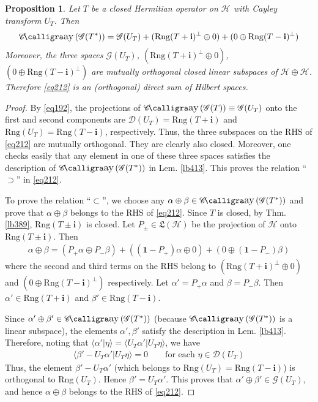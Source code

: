 \documentclass[12pt,b5paper,notitlepage]{article}
\theoremstyle{definition}
\theoremstyle{plain}
\newtheorem{pp}[df]{Proposition}
\DeclareMathOperator{\Cay}{\mathscr{C}\text{\kern -3pt {\calligra\large ay}}\,}
\newcommand{\fk}{\mathfrak}
\newcommand{\idt}{\mathbf{1}}
\newcommand{\Dom}{\mathscr{D}}
\newcommand{\bk}[1]{\langle {#1}\rangle}
\newcommand{\im}{\mathbf{i}}
\newcommand{\Rng}{\mathrm{Rng}}
\newcommand{\MH}{\mathcal H}
\newcommand{\SG}{\mathscr G}
\numberwithin{equation}{section}
\begin{document}
\begin{pp}
Let $T$ be a closed Hermitian operator on $\MH$ with Cayley transform $U_T$. Then
\begin{align}\label{eq212}
\Cay(\SG(T^*))=\SG(U_T)+(\Rng(T+\im)^\perp\oplus 0)+(0\oplus\Rng(T-\im)^\perp)
\end{align}
Moreover, the three spaces $\SG(U_T)$, $(\Rng(T+\im)^\perp\oplus 0)$, $(0\oplus\Rng(T-\im)^\perp)$ are mutually orthogonal closed linear subspaces of $\MH\oplus\MH$. Therefore \eqref{eq212} is an (orthogonal) direct sum of Hilbert spaces.
\end{pp}

\begin{proof}
By \eqref{eq192}, the projections of $\Cay(\SG(T))\equiv\SG(U_T)$ onto the first and second components are $\Dom(U_T)=\Rng(T+\im)$ and $\Rng(U_T)=\Rng(T-\im)$, respectively. Thus, the three subspaces on the RHS of \eqref{eq212} are mutually orthogonal. They are clearly also closed. Moreover, one checks easily that any element in one of these three spaces satisfies the description of $\Cay(\SG(T^*))$ in Lem. \ref{lb413}. This proves the relation ``$\supset$'' in \eqref{eq212}.

To prove the relation ``$\subset$'', we choose any $\alpha\oplus\beta\in\Cay(\SG(T^*))$ and prove that $\alpha\oplus\beta$ belongs to the RHS of \eqref{eq212}. Since $T$ is closed, by Thm. \ref{lb389}, $\Rng(T\pm\im)$ is closed. Let $P_\pm\in\fk L(\MH)$ be the projection of $\MH$ onto $\Rng(T\pm\im)$. Then
\begin{align*}
\alpha\oplus\beta=(P_+\alpha\oplus P_-\beta)+((\idt-P_+)\alpha\oplus0)+(0\oplus (\idt-P_-)\beta)
\end{align*}
where the second and third terms on the RHS belong to $(\Rng(T+\im)^\perp\oplus 0)$ and $(0\oplus\Rng(T-\im)^\perp)$ respectively. Let $\alpha'=P_+\alpha$ and $\beta=P_-\beta$. Then $\alpha'\in\Rng(T+\im)$ and $\beta'\in\Rng(T-\im)$.

Since $\alpha'\oplus\beta'\in\Cay(\SG(T^*))$ (because $\Cay(\SG(T^*))$ is a linear subspace), the elements $\alpha',\beta'$ satisfy the description in Lem. \ref{lb413}. Therefore, noting that $\bk{\alpha'|\eta}=\bk{U_T\alpha'|U_T\eta}$, we have
\begin{align*}
\bk{\beta'-U_T\alpha'|U_T\eta}=0\qquad\text{for each }\eta\in\Dom(U_T)
\end{align*}
Thus, the element $\beta'-U_T\alpha'$ (which belongs to $\Rng(U_T)=\Rng(T-\im)$) is orthogonal to $\Rng(U_T)$. Hence $\beta'=U_T\alpha'$. This proves that $\alpha'\oplus\beta'\in\SG(U_T)$, and hence $\alpha\oplus\beta$ belongs to the RHS of \eqref{eq212}.
\end{proof}
\end{document}
